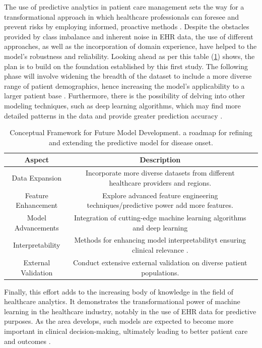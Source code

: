 \documentclass[manuscript,screen,]{acmart}
\begin{document}
The use of predictive analytics in patient care management sets the way for a transformational approach in which healthcare professionals can foresee and prevent risks by employing informed, proactive methods \cite{Wang2018BigData}. Despite the obstacles provided by class imbalance and inherent noise in EHR data, the use of different approaches, as well as the incorporation of domain experience, have helped to the model's robustness and reliability.
Looking ahead as per this table (\ref{tab: Framework for Future Model Development.})  shows, the plan is to build on the foundation established by this first study. The following phase will involve widening the breadth of the dataset to include a more diverse range of patient demographics, hence increasing the model's applicability to a larger patient base \cite{bellg2004enhancing}. Furthermore, there is the possibility of delving into other modeling techniques, such as deep learning algorithms, which may find more detailed patterns in the data and provide greater prediction accuracy \cite{Sengupta2020DeepLearning}.

\begin{table}[h]
    \centering
    \begin{tabular}{|c|c|c|}
    \hline
    Aspect & Description\\
    \hline
    Data Expansion & Incorporate more diverse datasets from different healthcare providers and regions.\\
    \hline
    Feature Enhancement & Explore advanced feature engineering techniques/predictive power add more features.\\
    \hline
    Model Advancements & Integration of cutting-edge machine learning algorithms and deep learning\\
     \hline
    Interpretability & Methods for enhancing model interpretabilityt  ensuring clinical relevance .\\
     \hline
    External Validation & Conduct extensive external validation on diverse patient populations.\\
    \hline
    \end{tabular}
    \caption{Conceptual Framework for Future Model Development. a roadmap for refining and extending the predictive model for disease onset.}
    \label{tab: Framework for Future Model Development.}
    
\end{table}

Finally, this effort adds to the increasing body of knowledge in the field of healthcare analytics. It demonstrates the transformational power of machine learning in the healthcare industry, notably in the use of EHR data for predictive purposes. As the area develops, such models are expected to become more important in clinical decision-making, ultimately leading to better patient care and outcomes \cite{Adeyemi2013}.






%
\end{document}

